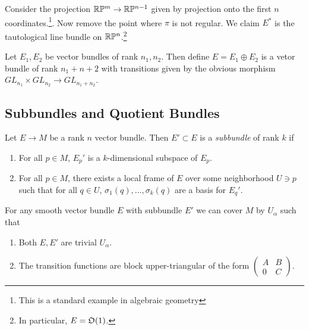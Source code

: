 \documentclass[twoside, 10pt]{article}
\begin{document}
    \begin{exm} Consider the projection $\mathbb{R}\mathbb{P}^m \to \mathbb{R}\mathbb{P}^{n-1}$ given by
        projection onto the first $n$ coordinates.\footnote{This is a standard
        example in algebraic geometry}. Now remove the point where $\pi$ is not
        regular. We claim $E^*$ is the tautological line bundle on
        $\mathbb{R}\mathbb{P}^n$.\footnote{In particular, $E = \mathfrak{O}(1)$.} \end{exm}
    
    \begin{exm} Let $E_1, E_2$ be vector bundles of rank $n_1, n_2$. Then
    define $E = E_1 \oplus E_2$ is a vetor bundle of rank $n_1 + n+2$ with
transitions given by the obvious morphism $GL_{n_1} \times GL_{n_2} \to
GL_{n_1+n_2}$.  \end{exm}

    \subsection{Subbundles and Quotient Bundles}%
    \label{sub:subbundles_and_quotient_bundles}
    
    \begin{defn} Let $E \to M$ be a rank $n$ vector bundle. Then $E' \subset E$
        is a \textit{subbundle} of rank $k$ if \begin{enumerate} \item For all
            $p \in M$, $E_p'$ is a $k$-dimensional subspace of $E_p$.  \item
            For all $p \in M$, there exists a local frame of $E$ over some
            neighborhood $U \ni p$ such that for all $q \in U$, $\sigma_1(q),
            \ldots, \sigma_k(q)$ are a basis for $E_q'$.  \end{enumerate}
        \end{defn}

    \begin{prop} For any smooth vector bundle $E$ with subbundle $E'$ we can
        cover $M$ by $U_{\alpha}$ such that \begin{enumerate} \item Both $E,E'$
            are trivial $U_{\alpha}$.  \item The transition functions are block
            upper-triangular of the form $ \begin{pmatrix} A & B \\ 0 & C
        \end{pmatrix}. $ \end{enumerate} \end{prop}
\end{document}
